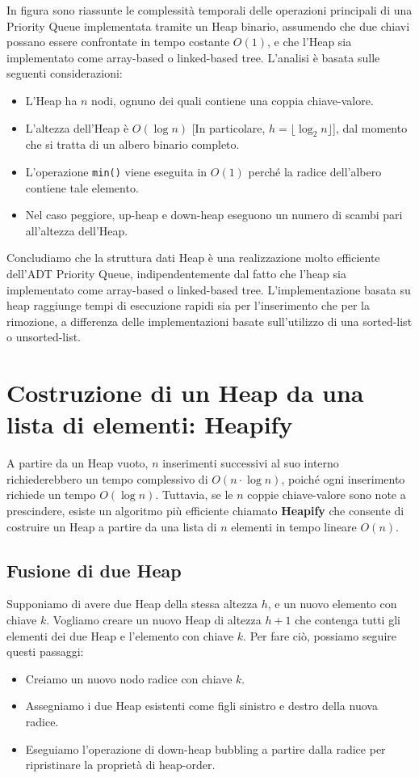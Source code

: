 In figura sono riassunte le complessità temporali delle operazioni principali di una Priority Queue implementata tramite un Heap binario, assumendo che due chiavi possano essere confrontate in tempo costante $O(1)$, e che l'Heap sia implementato come array-based o linked-based tree. L'analisi è basata sulle seguenti considerazioni:
\begin{itemize}
    \item L'Heap ha $n$ nodi, ognuno dei quali contiene una coppia chiave-valore.
    \item L'altezza dell'Heap è $O(\log n)$ [In particolare, $h = \lfloor \log_2 n \rfloor$], dal momento che si tratta di un albero binario completo.
    \item L'operazione \texttt{min()} viene eseguita in $O(1)$ perché la radice dell'albero contiene tale elemento.
    \item Nel caso peggiore, up-heap e down-heap eseguono un numero di scambi pari all'altezza dell'Heap.
\end{itemize}

Concludiamo che la struttura dati Heap è una realizzazione molto efficiente dell'ADT Priority Queue, indipendentemente dal fatto che l'heap sia implementato come array-based o linked-based tree. L'implementazione basata su heap raggiunge tempi di esecuzione rapidi sia per l'inserimento che per la rimozione, a differenza delle implementazioni basate sull'utilizzo di una sorted-list o unsorted-list.



\section{Costruzione di un Heap da una lista di elementi: Heapify}
A partire da un Heap vuoto, $n$ inserimenti successivi al suo interno richiederebbero un tempo complessivo di $O(n \cdot \log n)$, poiché ogni inserimento richiede un tempo $O(\log n)$. Tuttavia, se le $n$ coppie chiave-valore sono note a prescindere, esiste un algoritmo più efficiente chiamato \textbf{Heapify} che consente di costruire un Heap a partire da una lista di $n$ elementi in tempo lineare $O(n)$.

\subsection*{Fusione di due Heap}
Supponiamo di avere due Heap della stessa altezza $h$, e un nuovo elemento con chiave $k$. Vogliamo creare un nuovo Heap di altezza $h + 1$ che contenga tutti gli elementi dei due Heap e l'elemento con chiave $k$. Per fare ciò, possiamo seguire questi passaggi:
\begin{itemize}
    \item Creiamo un nuovo nodo radice con chiave $k$.
    \item Assegniamo i due Heap esistenti come figli sinistro e destro della nuova radice.
    \item Eseguiamo l'operazione di down-heap bubbling a partire dalla radice per ripristinare la proprietà di heap-order.
\end{itemize}

